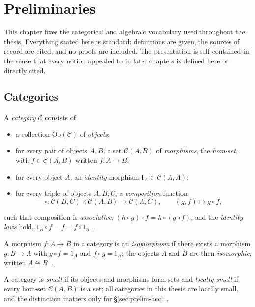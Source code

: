 \chapter{Preliminaries}\label{ch:prelim}

This chapter fixes the categorical and algebraic vocabulary used throughout
the thesis. Everything stated here is standard: definitions are given, the
sources of record are cited, and no proofs are included. The presentation is
self-contained in the sense that every notion appealed to in later chapters
is defined here or directly cited.

\section{Categories}\label{sec:prelim-cat}

\begin{definition}[Category]
A \emph{category} $\mathcal{C}$ consists of
\begin{itemize}
  \item a collection $\mathrm{Ob} (\mathcal{C})$ of \emph{objects};
  \item for every pair of objects $A, B$, a set $\mathcal{C} (A,B)$ of
        \emph{morphisms}, the \emph{hom-set}, with $f \in \mathcal{C} (A,B)$
        written $f \colon A \to B$;
  \item for every object $A$, an \emph{identity} morphism
        $1_A \in \mathcal{C} (A,A)$;
  \item for every triple of objects $A, B, C$, a \emph{composition} function
        \[ \circ \colon \mathcal{C} (B,C) \times \mathcal{C} (A,B)
           \to \mathcal{C} (A,C), \qquad (g, f) \mapsto g \circ f, \]
\end{itemize}
such that composition is \emph{associative}, $(h \circ g) \circ f
= h \circ (g \circ f)$, and the \emph{identity laws} hold,
$1_B \circ f = f = f \circ 1_A$~\cite{maclane}.
\end{definition}

\begin{definition}[Isomorphism]
A morphism $f \colon A \to B$ in a category is an \emph{isomorphism} if
there exists a morphism $g \colon B \to A$ with $g \circ f = 1_A$ and
$f \circ g = 1_B$; the objects $A$ and $B$ are then \emph{isomorphic},
written $A \cong B$~\cite{maclane}.
\end{definition}

\begin{remark}
A category is \emph{small} if its objects and morphisms form sets and
\emph{locally small} if every hom-set $\mathcal{C} (A,B)$ is a set; all
categories in this thesis are locally small, and the distinction matters only
for \S\ref{sec:prelim-acc}~\cite{maclane}.
\end{remark}


